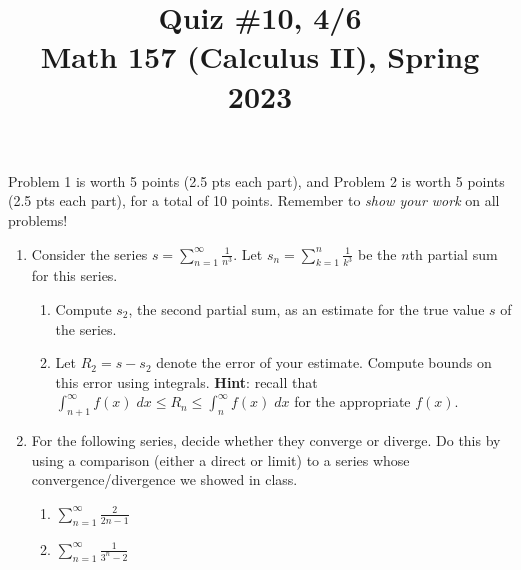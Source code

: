 \documentclass[11pt]{article}
\title{Quiz \#10, 4/6\\ Math 157 (Calculus II), Spring 2023}
\date{}
\begin{document}
\maketitle

\thispagestyle{empty}

\vspace{-2cm}

Problem 1 is worth 5 points (2.5 pts each part), and Problem 2 is worth 5 points (2.5 pts each part), for a total of 10 points. Remember to \emph{show your work} on all problems!

\begin{enumerate}

\item Consider the series $s = \displaystyle \sum_{n=1}^{\infty}\frac{1}{n^3}$. Let $s_n = \displaystyle \sum_{k=1}^{n} \frac{1}{k^3}$ be the $n$th partial sum for this series.

\begin{enumerate}
\item Compute $s_2$, the second partial sum, as an estimate for the true value $s$ of the series.
\item Let $R_2 = s - s_2$ denote the error of your estimate. Compute bounds on this error using integrals. {\bf Hint}: recall that $\int_{n+1}^{\infty} f(x) \; dx \leq R_n \leq \int_{n}^{\infty} f(x) \; dx$ for the appropriate $f(x)$.
\end{enumerate}

\vspace{2.5in}

\item For the following series, decide whether they converge or diverge. Do this by using a comparison (either a direct or limit) to a series whose convergence/divergence we showed in class.

\begin{enumerate}
\item $\displaystyle \sum_{n=1}^{\infty} \frac{2}{2n-1}$
\item $\displaystyle \sum_{n=1}^{\infty} \frac{1}{3^n - 2}$
\end{enumerate}

\end{enumerate}
\end{document}
